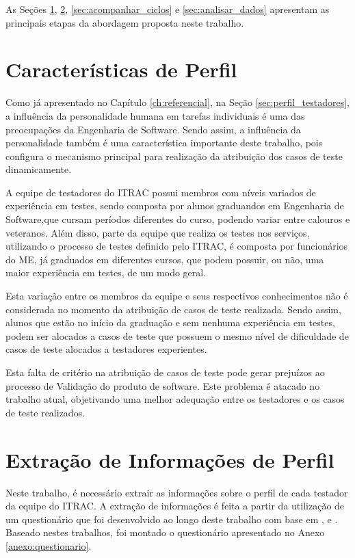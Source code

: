 As Seções \ref{sec:caracteristicas_importantes}, \ref{sec:extrair_caracteristicas}, \ref{sec:acompanhar_ciclos} e \ref{sec:analisar_dados} apresentam as principais etapas da abordagem proposta neste trabalho.

\section{Características de Perfil}
\label{sec:caracteristicas_importantes}

Como já apresentado no Capítulo \ref{ch:referencial}, na Seção \ref{sec:perfil_testadores}, a influência da personalidade humana em tarefas individuais é uma das preocupações da Engenharia de Software.  Sendo assim, a influência da personalidade também é uma característica importante deste trabalho, pois configura o mecanismo principal para realização da atribuição dos casos de teste dinamicamente.

A equipe de testadores do ITRAC possui membros com níveis variados de experiência em testes, sendo composta por alunos graduandos em Engenharia de Software,que cursam períodos diferentes do curso, podendo variar entre calouros e veteranos.  Além disso, parte da equipe que realiza os testes nos serviços, utilizando o processo de testes definido pelo ITRAC, é composta por funcionários do ME, já graduados em diferentes cursos, que podem possuir, ou não, uma maior experiência em testes, de um modo geral.

Esta variação entre os membros da equipe e seus respectivos conhecimentos não é considerada no momento da atribuição de casos de teste realizada.  Sendo assim, alunos que estão no início da graduação e sem nenhuma experiência em testes, podem ser alocados a casos de teste que possuem o mesmo nível de dificuldade de casos de teste alocados a testadores experientes.

Esta falta de critério na atribuição de casos de teste pode gerar prejuízos ao processo de Validação do produto de software. Este problema é atacado no trabalho atual, objetivando uma melhor adequação entre os testadores e os casos de teste realizados.

\section{Extração de Informações de Perfil}
\label{sec:extrair_caracteristicas}

Neste trabalho, é necessário extrair as informações sobre o perfil de cada testador da equipe do ITRAC. A extração de informações é feita a partir da utilização de um questionário que foi desenvolvido ao longo deste trabalho com base em \cite{Santos19SDPA}, \cite{geras2004survey} e \cite{groves2000survey}. Baseado nestes trabalhos, foi montado o questionário apresentado no Anexo \ref{anexo:questionario}.

